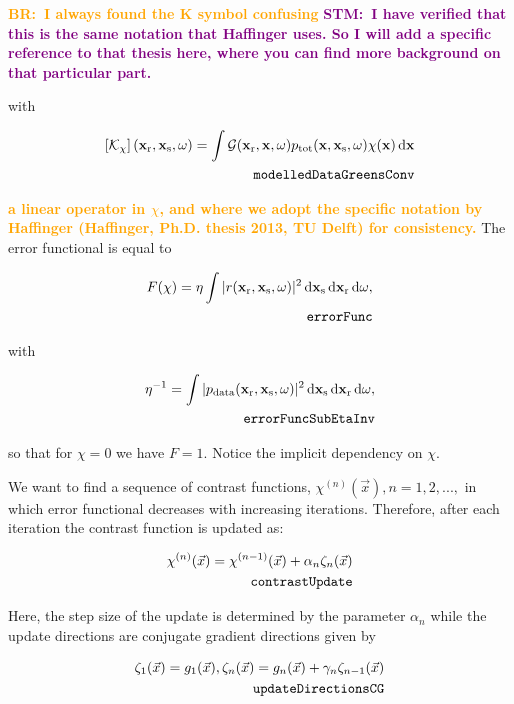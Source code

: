 \documentclass[10pt,a4paper]{article}
\newcommand{\df}[1]{\, \ensuremath{\mbox{d}#1}}
\newcommand{\commentstmtwo}[1]{\textcolor{purple}{\textbf{STM:\ #1}}}
\newcommand{\newstmtwo}[1]{\textcolor{orange}{\textbf{#1}}}
\newcommand{\commentbr}[1]{\textcolor{orange}{\textbf{BR:\ #1}}}
\newcommand{\xs}{\mathbf{x}_\text{s}}
\newcommand{\xr}{\mathbf{x}_\text{r}}
\newcommand{\x}{\mathbf{x}}
\begin{document}
\commentbr{I always found the K symbol confusing}
\commentstmtwo{I have verified that this is the same notation that
Haffinger uses. So I will add a specific reference to that thesis
here, where you can find more background on that particular part.}

with

\begin{align} \label{eq:modelledDataGreensConv} \left[\mathcal{K}_\chi \right](\xr,
\xs, \omega) = \int \mathcal{G}(\xr, \x, \omega) p_\text{tot}(\x, \xs,
\omega) \chi(\x) \df{\x}\\
\tag*{\texttt{modelledDataGreensConv}}
\end{align}

\newstmtwo{a linear operator in $\chi$, and where we adopt the specific notation
by Haffinger (Haffinger, Ph.D. thesis 2013, TU Delft) for consistency.}
The error functional is equal to

\begin{align} \label{eq:errorFunc} F(\chi) = \eta \int |r(\xr, \xs,
\omega)|^2 \df{\mathbf{x}_\text{s}} \df{\xr}
\df{\omega},\\
\tag*{\texttt{errorFunc}}
\end{align}

with

\begin{align} \label{eq:errorFuncSubEtaInv} \eta^{-1} = \int | p_\text{data}(\xr,
\xs, \omega) |^2 \df{\xs} \df{\xr} \df{\omega}, \\
\tag*{\texttt{errorFuncSubEtaInv}} 
 \end{align}

so that for $\chi = 0$ we have $F = 1$. Notice the implicit dependency
on $\chi$.

We want to find a sequence of contrast functions,
$\chi^{(n)}(\vec{x}), n = 1,2,...,$ in which error functional
decreases with increasing iterations. Therefore, after each iteration
the contrast function is updated as:

\begin{align} \label{eq:contrastUpdate} \chi^{(n)}(\vec{x}) =
\chi^{(n-1)}(\vec{x}) + \alpha_n\zeta_n(\vec{x})\\
\tag*{\texttt{contrastUpdate}}
\end{align}

Here, the step size of the update is determined by the parameter
$\alpha_n$ while the update directions are conjugate gradient
directions given by

\begin{align} \label{eq:updateDirectionsCG}\zeta_1(\vec{x}) = g_1(\vec{x})
,\zeta_n(\vec{x}) = g_n(\vec{x}) + \gamma_n\zeta_{n-1}(\vec{x})\\
\tag*{\texttt{updateDirectionsCG}}
\end{align}
\end{document}
